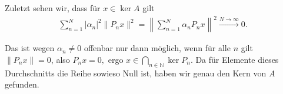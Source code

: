 \begin{solution}
Zuletzt sehen wir, dass für $x \in \ker A$ gilt
\begin{align*}
    \sum_{n=1}^N |\alpha_n|^2 \|P_n x\|^2 =
    \left\| \sum_{n = 1}^N \alpha_n P_n x \right\|^2 \stackrel{N \rightarrow \infty}{\longrightarrow} 0.
\end{align*}

Das ist wegen $\alpha_n \neq 0$ offenbar nur dann möglich, wenn für alle $n$ gilt $\|P_n x\| = 0$, also $P_n x = 0,$ ergo $x \in \bigcap_{n \in \mathbb{N}} \ker P_n$. Da für Elemente dieses Durchschnitts die Reihe sowieso Null ist, haben wir genau den Kern von $A$ gefunden.

\end{solution}
